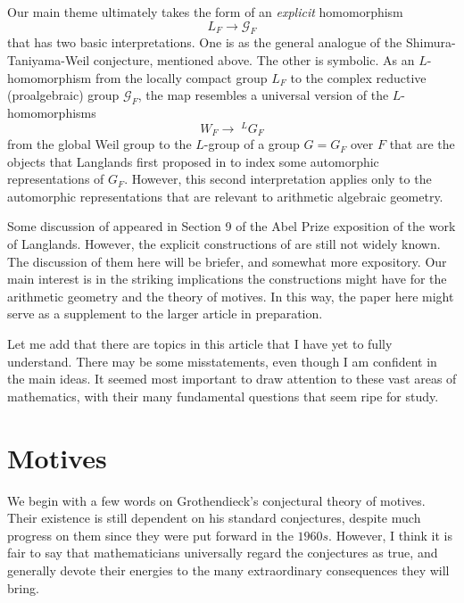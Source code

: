 \documentclass[preprint,12pt, leqno]{elsarticle}
\newcommand{\UGal}{\mathcal{G}_F}
\newcommand{\ubf}[1]{\textit{#1}}
\newcommand{\LG}{\;^LG}
\numberwithin{equation}{section}
\theoremstyle{named}
\begin{document}
Our main theme ultimately takes the form of an \ubf{explicit} homomorphism
\begin{equation*}
    L_F\longrightarrow\UGal
\end{equation*}
that has two basic interpretations. One is as the general analogue of the Shimura-Taniyama-Weil conjecture, mentioned above. The other is symbolic. As an $L$-homomorphism from the locally compact group $L_F$ to the complex reductive (proalgebraic) group $\UGal$, the map resembles a universal version of the $L$-homomorphisms
\begin{equation*}
    W_F \rightarrow\LG_F
\end{equation*}
from the global Weil group to the $L$-group of a group $G = G_F$ over $F$ that are the objects that Langlands first proposed in \cite{L2} to index some automorphic representations of $G_F$. However, this second interpretation applies only to the automorphic representations that are relevant to arithmetic algebraic geometry.

Some discussion of \cite{Ar2} appeared in Section 9 of the Abel Prize exposition \cite{N1} of the work of Langlands. However, the explicit constructions of \cite{Ar2} are still not widely known. The discussion of them here will be briefer, and somewhat more expository. Our main interest is in the striking implications the constructions might have for the arithmetic geometry and the theory of motives. In this way, the paper here might serve as a supplement to the larger article \cite{N2} in preparation.

Let me add that there are topics in this article that I have yet to fully understand. There may be some misstatements, even though I am confident in the main ideas. It seemed most important to draw attention to these vast areas of mathematics, with their many fundamental questions that seem ripe for study.

\section{Motives}\label{sec: motives}

We begin with a few words on Grothendieck's conjectural theory of motives. Their existence is still dependent on his standard conjectures, despite much progress on them since they were put forward in the $1960s$. However, I think it is fair to say that mathematicians universally regard the conjectures as true, and generally devote their energies to the many extraordinary consequences they will bring.
\end{document}
